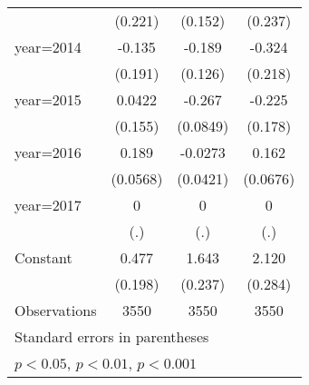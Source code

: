 {\begin{tabular}{l*{3}{c}}
                    &     (0.221)         &     (0.152)         &     (0.237)         \\
[1em]
year=2014           &      -0.135         &      -0.189         &      -0.324         \\
                    &     (0.191)         &     (0.126)         &     (0.218)         \\
[1em]
year=2015           &      0.0422         &      -0.267\sym{**} &      -0.225         \\
                    &     (0.155)         &    (0.0849)         &     (0.178)         \\
[1em]
year=2016           &       0.189\sym{**} &     -0.0273         &       0.162\sym{*}  \\
                    &    (0.0568)         &    (0.0421)         &    (0.0676)         \\
[1em]
year=2017           &           0         &           0         &           0         \\
                    &         (.)         &         (.)         &         (.)         \\
[1em]
Constant            &       0.477\sym{*}  &       1.643\sym{***}&       2.120\sym{***}\\
                    &     (0.198)         &     (0.237)         &     (0.284)         \\
\hline
Observations        &        3550         &        3550         &        3550         \\
\hline\hline
\multicolumn{4}{l}{\footnotesize Standard errors in parentheses}\\
\multicolumn{4}{l}{\footnotesize \sym{*} \(p<0.05\), \sym{**} \(p<0.01\), \sym{***} \(p<0.001\)}\\
\end{tabular}
}
